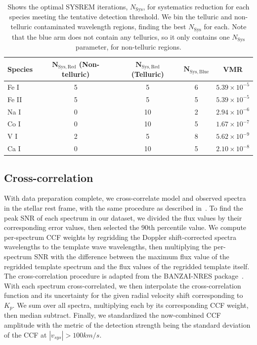 \documentclass[twocolumn]{aastex631}
\begin{document}
        \begin{table}[ht]\label{tab:sysrem_and_vmr}
            \centering
            \begin{tabular}{lcccc}
                \textbf{Species} & $\textbf{N}_{\mathrm{Sys},\text{Red}}$ (Non-telluric) & $\textbf{N}_{\mathrm{Sys},\text{Red}}$ (Telluric) & $\textbf{N}_{\mathrm{Sys},\text{Blue}}$ & VMR \\
                \hline
                Fe I & 5 & 5 & 6 & $5.39 \times 10^{-5}$ \\        
                Fe II & 5 & 5 & 5 & $5.39 \times 10^{-5}$ \\
                Na I & 0 & 10 & 2 & $2.94 \times 10^{-6}$ \\
                Co I & 0 & 10 & 5 & $1.67 \times 10^{-7}$ \\
                V I & 2 & 5 & 8 & $5.62 \times 10^{-9}$ \\
                Ca I & 0 & 10 & 5 & $2.10 \times 10^{-8}$ \\
            \end{tabular}
            
            \caption{Shows the optimal SYSREM iterations, $N_{\mathrm{Sys}}$, for systematics reduction for each species meeting the tentative detection threshold. We bin the telluric and non-telluric contaminated wavelength regions, finding the best $N_{\mathrm{Sys}}$ for each. Note that the blue arm does not contain any tellurics, so it only contains one $N_{\mathrm{Sys}}$ parameter, for non-telluric regions.}
            

        \end{table}

        \subsection{Cross-correlation}
            With data preparation complete, we cross-correlate model and observed spectra in the stellar rest frame, with the same procedure as described in~\citet{Johnson2023}. To find the peak SNR of each spectrum in our dataset, we divided the flux values by their corresponding error values, then selected the 90th percentile value. We compute per-spectrum CCF weights by regridding the Doppler shift-corrected spectra wavelengths to the template wave wavelengths, then multiplying the per-spectrum SNR with the difference between the maximum flux value of the regridded template spectrum and the flux values of the regridded template itself. The cross-correlation procedure is adapted from the BANZAI-NRES package~\citep{McCully2022}. With each spectrum cross-correlated, we then interpolate the cross-correlation function and its uncertainty for the given radial velocity shift corresponding to $K_p$. We sum over all spectra, multiplying each by its corresponding CCF weight, then median subtract. Finally, we standardized the now-combined CCF amplitude with the metric of the detection strength being the standard deviation of the CCF at $|v_{sys}| > 100 km/s$.
            
\end{document}
